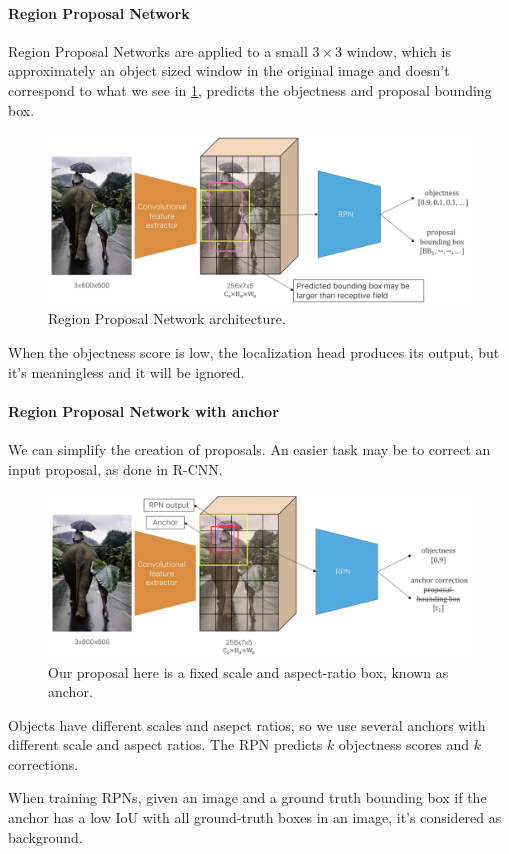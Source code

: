 \paragraph{Region Proposal Network}

Region Proposal Networks are applied to a small $3\times 3$ window, which is approximately an object sized window in the original image and doesn't correspond to what we see in \ref{fig:rpn}, predicts the objectness and proposal bounding box.

\begin{figure}[htbp]
  \centering
  \includegraphics[width=0.6\linewidth]{./img/rpn.jpg}
  \caption{Region Proposal Network architecture.}
  \label{fig:rpn}
\end{figure}

When the objectness score is low, the localization head produces its output, but it's meaningless and it will be ignored.

\paragraph{Region Proposal Network with anchor}
We can simplify the creation of proposals.
An easier task may be to correct an input proposal, as done in R-CNN.

\begin{figure}[htbp]
  \centering
  \includegraphics[width=0.6\linewidth]{./img/rpn_anchor.jpg}
  \caption{Our proposal here is a fixed scale and aspect-ratio box, known as anchor.}
\end{figure}

Objects have different scales and asepct ratios, so we use several anchors with different scale and aspect ratios.
The RPN predicts $k$ objectness scores and $k$ corrections.

When training RPNs, given an image and a ground truth bounding box if the anchor has a low IoU with all ground-truth boxes in an image, it's considered as background.

